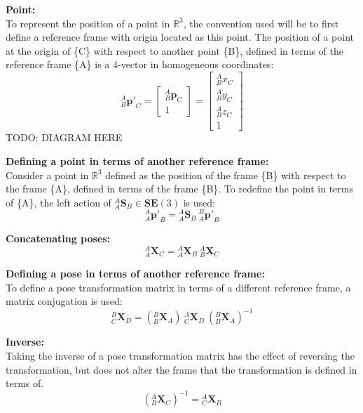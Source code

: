 		\textbf{Point:}\\
		To represent the position of a point in $\mathbb{R}^3$, the convention used will be to first define a reference frame with origin located as this point. The position of a point at the origin of \{C\} with respect to another point \{B\}, defined in terms of the reference frame \{A\} is a 4-vector in homogeneous coordinates:
		\begin{equation}
			{^{A}_{B}\mathbf{p'}^{}_{C}} = 
			\begin{bmatrix}
				{^{A}_{B}\mathbf{p}^{}_{C}} \\
				1
			\end{bmatrix} = 
			\begin{bmatrix}
				{^{A}_{B}x^{}_{C}} \\
				{^{A}_{B}y^{}_{C}} \\
				{^{A}_{B}z^{}_{C}} \\
				1
			\end{bmatrix}
		\end{equation}
		TODO: DIAGRAM HERE
		
		\textbf{Defining a point in terms of another reference frame:}\\
		Consider a point in $\mathbb{R}^3$ defined as the position of the frame \{B\} with respect to the frame \{A\}, defined in terms of the frame \{B\}. To redefine the point in terms of \{A\}, the left action of ${^{A}_{A}\mathbf{S}^{}_{B}} \in \mathbf{SE}(3)$ is used:
		\begin{equation}
			{^{A}_{A}\mathbf{p'}^{}_{B}} = {^{A}_{A}\mathbf{S}^{}_{B}}\:{^{B}_{A}\mathbf{p'}^{}_{B}}
		\end{equation}
		
		\textbf{Concatenating poses:}\\
		\begin{equation}
			{^{A}_{A}\mathbf{X}^{}_{C}} = {^{A}_{A}\mathbf{X}^{}_{B}}\:{^{A}_{B}\mathbf{X}^{}_{C}}
		\end{equation}
		
		\textbf{Defining a pose in terms of another reference frame:}\\
		To define a pose transformation matrix in terms of a different reference frame, a matrix conjugation is used:
		\begin{equation}
			{^{B}_{C}\mathbf{X}^{}_{D}} = ({^{B}_{B}\mathbf{X}^{}_{A}})\:{^{A}_{C}\mathbf{X}^{}_{D}}\:({^{B}_{B}\mathbf{X}^{}_{A}})^{-1}
		\end{equation}

		\textbf{Inverse:}\\
		Taking the inverse of a pose transformation matrix has the effect of reversing the transformation, but does not alter the frame that the transformation is defined in terms of.
		\begin{equation}
			({^{A}_{B}\mathbf{X}^{}_{C}})^{-1} = {^{A}_{C}\mathbf{X}^{}_{B}}
		\end{equation}
	

